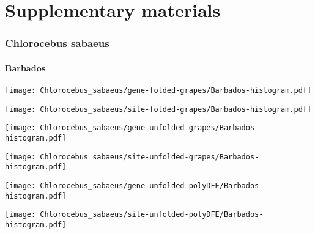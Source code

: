 \documentclass{article}
\begin{document}
\part*{Supplementary materials}
\tableofcontents
 
\pagebreak
\section{Chlorocebus sabaeus}

\subsection{Barbados}
\centering
\begin{minipage}{0.49\linewidth}
    \texttt{[image: Chlorocebus\_sabaeus/gene-folded-grapes/Barbados-histogram.pdf]}
\end{minipage}%
\hfill
\begin{minipage}{0.49\linewidth}
    \texttt{[image: Chlorocebus\_sabaeus/site-folded-grapes/Barbados-histogram.pdf]}
\end{minipage}
\hfill
\begin{minipage}{0.49\linewidth}
    \texttt{[image: Chlorocebus\_sabaeus/gene-unfolded-grapes/Barbados-histogram.pdf]}
\end{minipage}%
\hfill
\begin{minipage}{0.49\linewidth}
    \texttt{[image: Chlorocebus\_sabaeus/site-unfolded-grapes/Barbados-histogram.pdf]}
\end{minipage}
\hfill
\begin{minipage}{0.49\linewidth}
    \texttt{[image: Chlorocebus\_sabaeus/gene-unfolded-polyDFE/Barbados-histogram.pdf]}
\end{minipage}%
\hfill
\begin{minipage}{0.49\linewidth}
    \texttt{[image: Chlorocebus\_sabaeus/site-unfolded-polyDFE/Barbados-histogram.pdf]}
\end{minipage}
\hfill
\end{document}

